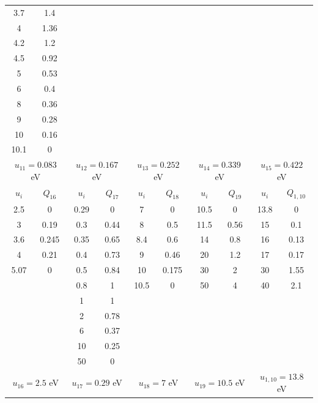 \documentclass{report}
\begin{document}
\begin{table}
\begin{tabular}{|c|c||c|c||c|c||c|c||c|c|}
3.7   & 1.4  &       &      &       &      &      &      &      &      \\ 
4     & 1.36 &       &      &       &      &      &      &      &      \\ 
4.2   & 1.2  &       &      &       &      &      &      &      &      \\ 
4.5   & 0.92 &       &      &       &      &      &      &      &      \\ 
5     & 0.53 &       &      &       &      &      &      &      &      \\ 
6     & 0.4  &       &      &       &      &      &      &      &      \\ 
8     & 0.36 &       &      &       &      &      &      &      &      \\ 
9     & 0.28 &       &      &       &      &      &      &      &      \\ 
10    & 0.16 &       &      &       &      &      &      &      &      \\ 
10.1  & 0    &       &      &       &      &      &      &      &      \\
\multicolumn{2}{|c||}{$u_{11}=0.083$ eV} &
\multicolumn{2}{c||}{$u_{12}=0.167$ eV} &
\multicolumn{2}{c||}{$u_{13}=0.252$ eV} &
\multicolumn{2}{c||}{$u_{14}=0.339$ eV} &
\multicolumn{2}{c|}{$u_{15}=0.422$ eV}\\
\hline
\hline 
$u_i$ & $Q_{16}$ & $u_i$ & $Q_{17}$ & $u_i$ & $Q_{18}$ & $u_i$ & $Q_{19}$ & $u_i$ & $Q_{1,10}$ \\                                                                             
\hline
2.5  & 0     & 0.29 & 0    & 7    & 0     & 10.5 & 0    & 13.8 & 0    \\
3    & 0.19  & 0.3  & 0.44 & 8    & 0.5   & 11.5 & 0.56 & 15   & 0.1  \\
3.6  & 0.245 & 0.35 & 0.65 & 8.4  & 0.6   & 14   & 0.8  & 16   & 0.13 \\
4    & 0.21  & 0.4  & 0.73 & 9    & 0.46  & 20   & 1.2  & 17   & 0.17 \\
5.07 & 0     & 0.5  & 0.84 & 10   & 0.175 & 30   & 2    & 30   & 1.55 \\
     &       & 0.8  & 1    & 10.5 & 0     & 50   & 4    & 40   & 2.1  \\
     &       & 1    & 1    &      &       &      &      &      &      \\
     &       & 2    & 0.78 &      &       &      &      &      &      \\
     &       & 6    & 0.37 &      &       &      &      &      &      \\
     &       & 10   & 0.25 &      &       &      &      &      &      \\
     &       & 50   & 0    &      &       &      &      &      &      \\
\multicolumn{2}{|c||}{$u_{16}=2.5$ eV} &
\multicolumn{2}{c||}{$u_{17}=0.29$ eV} &
\multicolumn{2}{c||}{$u_{18}=7$ eV} &
\multicolumn{2}{c||}{$u_{19}=10.5$ eV} &
\multicolumn{2}{c|}{$u_{1,10}=13.8$ eV}\\
\hline 
\end{tabular}
\end{table}
\end{document}
